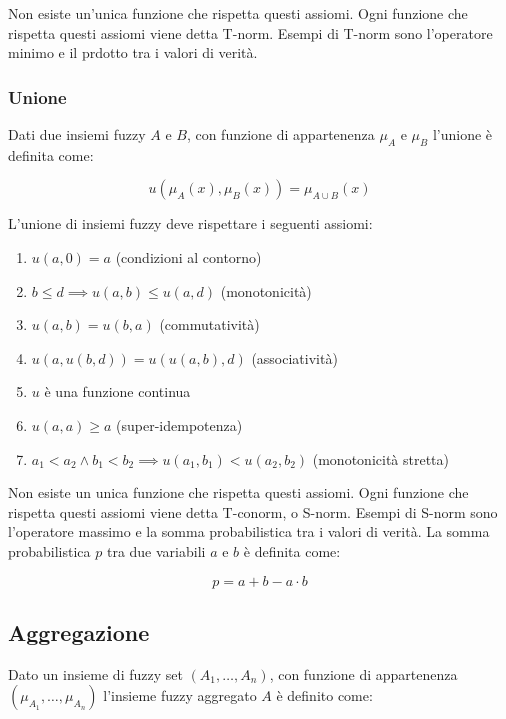 Non esiste un'unica funzione che rispetta questi assiomi. Ogni funzione che rispetta questi assiomi viene detta T-norm.
Esempi di T-norm sono l'operatore minimo e il prdotto tra i valori di verità.

\subsubsection{Unione}

Dati due insiemi fuzzy $A$ e $B$, con funzione di appartenenza $\mu_A$ e $\mu_B$ l'unione è definita come:

\begin{equation*}
 u(\mu_A(x), \mu_B(x)) = \mu_{A\cup B}(x)
\end{equation*}

L'unione di insiemi fuzzy deve rispettare i seguenti assiomi:

\begin{enumerate}
 \item $u(a, 0)=a$ (condizioni al contorno)
 \item $b \leq d \implies u(a,b) \leq u(a,d)$ (monotonicità)
 \item $u(a,b) = u(b,a)$ (commutatività)
 \item $u(a,u(b,d)) = u(u(a,b),d)$ (associatività)
 \item $u$ è una funzione continua
 \item $u(a,a) \geq a$ (super-idempotenza)
 \item $a_1< a_2 \wedge b_1 < b_2 \implies u(a_1,b_1)<u(a_2,b_2)$ (monotonicità stretta)
\end{enumerate}

Non esiste un unica funzione che rispetta questi assiomi. Ogni funzione che rispetta questi assiomi viene detta T-conorm, o S-norm.
Esempi di S-norm sono l'operatore massimo e la somma probabilistica tra i valori di verità.
La somma probabilistica $p$ tra due variabili $a$  e $b$ è definita come:

\begin{equation*}
 p = a+b - a\cdot b 
\end{equation*}

\subsection{Aggregazione}

Dato un insieme di fuzzy set $(A_1, \dots, A_n)$, con funzione di appartenenza $(\mu_{A_1}, \dots, \mu_{A_n})$ l'insieme fuzzy aggregato $A$ è definito come:

